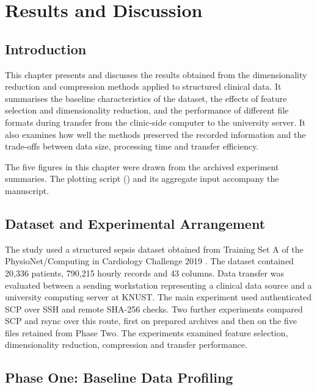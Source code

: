 \chapter{Results and Discussion}
\label{chap:Results}
\section{Introduction}

This chapter presents and discusses the results obtained from the dimensionality reduction and compression methods applied to structured clinical data. It summarises the baseline characteristics of the dataset, the effects of feature selection and dimensionality reduction, and the performance of different file formats during transfer from the clinic-side computer to the university server. It also examines how well the methods preserved the recorded information and the trade-offs between data size, processing time and transfer efficiency.

\noindent The five figures in this chapter were drawn from the archived experiment summaries. The plotting script () and its aggregate input accompany the manuscript.

\section{Dataset and Experimental Arrangement}\label{dataset-and-experimental-arrangement}

The study used a structured sepsis dataset obtained from Training Set A of the PhysioNet/Computing in Cardiology Challenge 2019 \citep{Reyna2019}. The dataset contained 20,336 patients, 790,215 hourly records and 43 columns. Data transfer was evaluated between a sending workstation representing a clinical data source and a university computing server at KNUST. The main experiment used authenticated SCP over SSH and remote SHA-256 checks. Two further experiments compared SCP and rsync over this route, first on prepared archives and then on the five files retained from Phase Two. The experiments examined feature selection, dimensionality reduction, compression and transfer performance.


\section{Phase One: Baseline Data
	Profiling}\label{phase-one-baseline-data-profiling}

